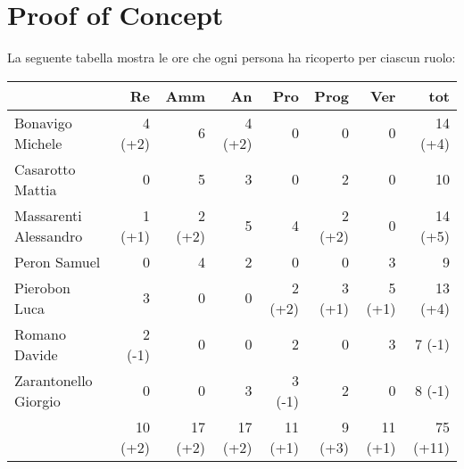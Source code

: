 \section{Proof of Concept}



La seguente tabella mostra le ore che ogni persona ha ricoperto per ciascun ruolo:

\begin{table}[ht]
    \begin{tabularx}{\linewidth}{X|rrrrrrr}
    \rowcolor{gray!30}& Re & Amm & An & Pro & Prog & Ver & tot \\
    \hline
    Bonavigo Michele                        & 4 (+2)     & 6        & 4 (+2)    & 0         & 0        & 0         & 14 (+4) \\

    \rowcolor{gray!10}Casarotto Mattia      & 0          & 5        & 3         & 0         & 2        & 0         & 10 \\

    Massarenti Alessandro                   & 1 (+1)     & 2 (+2)   & 5         & 4         & 2 (+2)   & 0         & 14 (+5) \\

    \rowcolor{gray!10}Peron Samuel          & 0          & 4        & 2         & 0         & 0        & 3         & 9 \\ 

    Pierobon Luca                           & 3          & 0        & 0         & 2 (+2)    & 3 (+1)   & 5 (+1)    & 13 (+4) \\ 

    \rowcolor{gray!10}Romano Davide         & 2 (-1)     & 0        & 0         & 2         & 0        & 3         & 7 (-1) \\ 

    Zarantonello Giorgio                    & 0          & 0        & 3         & 3 (-1)    & 2        & 0         & 8 (-1) \\ 

    \hline                                  & 10 (+2)    & 17 (+2)  & 17 (+2)   & 11 (+1)   & 9 (+3)   & 11 (+1)   & 75 (+11) \\  
    \end{tabularx}
\end{table}


